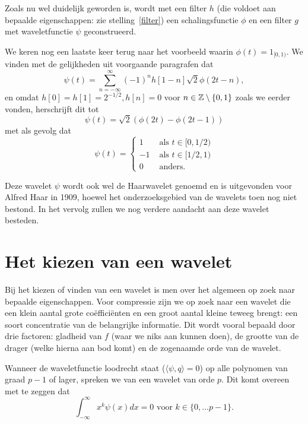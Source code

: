 Zoals nu wel duidelijk geworden is, wordt met een filter $h$ (die voldoet aan bepaalde eigenschappen: zie stelling~\ref{filter}) een schalingsfunctie $\phi$ en een filter $g$ met waveletfunctie $\psi$ geconstrueerd.

\begin{voorbeeld}
  We keren nog een laatste keer terug naar het voorbeeld waarin $\phi(t) = 1_{[0,1)}$. We vinden met de gelijkheden uit voorgaande paragrafen dat
    \[
    \psi\left(t\right) = \sum_{n=-\infty}^{\infty} (-1)^{n}h[1-n] \sqrt{2}\phi(2t-n),
    \]
    en omdat $h[0] = h[1] = 2^{-1/2}, h[n] = 0$ voor $n \in \mathbb{Z} \setminus \{0,1\}$ zoals we eerder vonden, herschrijft dit tot
    \[
    \psi\left(t\right) = \sqrt{2}\left(\phi(2t) - \phi(2t - 1)\right)
    \]
    met als gevolg dat
    \[
    \psi(t) = \begin{cases} 1 & \text{ als } t \in [0,1/2) \\ -1 & \text{ als } t \in [1/2,1) \\ 0 & \text{ anders.} \end{cases}
    \]

    Deze wavelet $\psi$ wordt ook wel de Haarwavelet genoemd en is uitgevonden voor Alfred Haar in 1909, hoewel het onderzoeksgebied van de wavelets toen nog niet bestond. In het vervolg zullen we nog verdere aandacht aan deze wavelet besteden.
\end{voorbeeld}

\section{Het kiezen van een wavelet}
Bij het kiezen of vinden van een wavelet is men over het algemeen op zoek naar bepaalde eigenschappen. Voor compressie zijn we op zoek naar een wavelet die een klein aantal grote co\"effici\"enten en een groot aantal kleine teweeg brengt: een soort concentratie van de belangrijke informatie. Dit wordt vooral bepaald door drie factoren: gladheid van $f$ (waar we niks aan kunnen doen), de grootte van de drager (welke hierna aan bod komt) en de zogenaamde orde van de wavelet.

\begin{definitie}
  Wanneer de waveletfunctie loodrecht staat ($\langle \psi, q\rangle = 0$) op alle polynomen van graad $p-1$ of lager, spreken we van een wavelet van orde $p$. Dit komt overeen met te zeggen dat
  \[
  \int_{-\infty}^\infty x^k \psi(x) dx = 0 \text{ voor } k \in \{ 0, \ldots p-1 \}.
  \]
\end{definitie}

